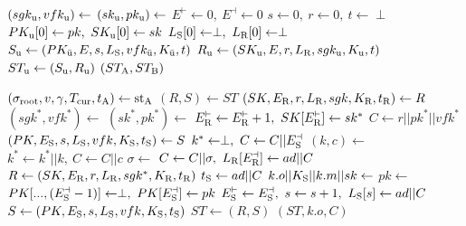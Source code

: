 \algrenewcommand\textproc{}
\algrenewcommand{}

\begin{minipage}{0.5\linewidth}
  {\fontsize{10}{12}\selectfont

  \begin{algorithmic}[1]
    \State $(sgk_\text{u},vfk_\text{u}) \gets$ 
    \State $(sk_\text{u},pk_\text{u}) \gets$ 
    \State $E^\vdash \gets 0, \ E^\dashv \gets 0$
    \State $s \gets 0, \ r \gets 0, \ t \gets \perp$
    \State $PK_\text{u}[0] \gets pk, \ SK_\text{u}[0] \gets sk$
    \State $L_\t{S}[0] \gets \perp, \ L_\t{R}[0] \gets \perp$
    \State $S_\text{u} \gets (PK_{\bar{\text{u}}},E,s,L_\text{S},
                          vfk_{\bar{\text{u}}},K_{\bar{\text{u}}},t)$
    \State $R_\text{u} \gets (SK_\text{u},E,r,L_\text{R},sgk_\text{u},K_\text{u},t)$
    \State $ST_\text{u} \gets (S_\text{u},R_\text{u})$
    \EndFor
    \State \Return $(ST_\text{A},ST_\text{B})$
    \EndProcedure
    
    \item[]
    
    \State $(\sigma_\text{root},v,\gamma,T_\text{cur},t_\text{A}) \gets \text{st}_\text{A}$
    \State $(R,S) \gets ST$
    \State $(SK,E_\text{R},r,L_\text{R},sgk,K_\text{R},t_\text{R}) \gets R$
    \State $(sgk^*,vfk^*) \gets$ 
    \State $(sk^*,pk^*) \gets$ 
    \State $E_\t{R}^\vdash \gets E_\t{R}^\vdash+1, \ SK[E_\t{R}^\vdash] \gets sk^*$
    \State $C \gets r || pk^* || vfk^*$
    \State $(PK,E_\text{S},s,L_\text{S},vfk,K_\text{S},t_\text{S}) \gets S$
    \State $k^* \gets \perp, \ C \gets C || E_\text{S}^\dashv$
    \State $(k,c) \gets$ 
    \State $k^* \gets k^* || k, \ C \gets C || c$ 
    \EndFor
    \State $\sigma \gets$ 
    \State $C \gets C || \sigma, \ L_\t{R}[E_\t{R}^\dashv] \gets ad||C$
    \State $R \gets (SK,E_\text{R},r,L_\text{R},sgk^*,K_\text{R},t_\text{R})$
    \State $t_\text{S} \gets ad||C$
    \State $k.o || K_\text{S} || k.m || sk \gets$ 
    \State $pk \gets$ 
    \State $PK[...,(E_\t{S}^\dashv -1)] \gets \perp, \ PK[E_\t{S}^\dashv] \gets pk$
    \State $E_\text{S}^\vdash \gets E_\text{S}^\dashv, \ s \gets s+1, \ L_\text{S}[s] \gets ad||C$
    \State $S \gets (PK,E_\text{S},s,L_\text{S},vfk,K_\text{S},t_\text{S})$
    \State $ST \gets (R,S)$
    \State \Return $(ST,k.o,C)$
    \EndProcedure
  \end{algorithmic}
  }
\end{minipage}
